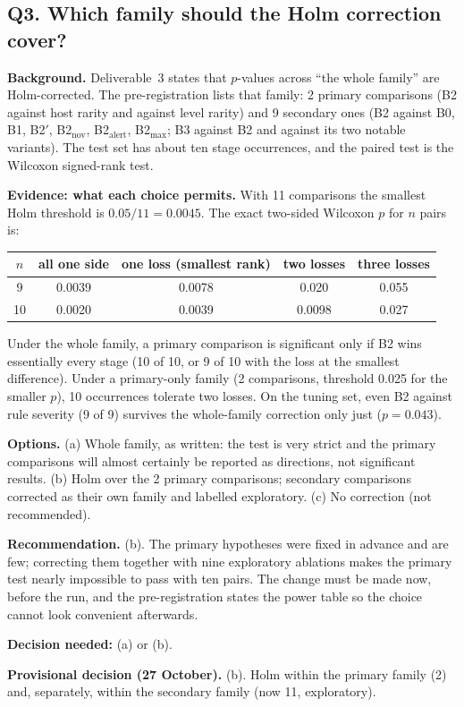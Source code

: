 \documentclass[10.5pt,a4paper]{article}
\newcommand{\rec}[1]{\par\smallskip\noindent\colorbox{gray!12}{\parbox{\dimexpr\linewidth-2\fboxsep}{\textbf{Recommendation.} #1}}\par\smallskip}
\newcommand{\ask}[1]{\par\noindent\textbf{Decision needed:} #1\par\medskip}
\newcommand{\dec}[1]{\par\smallskip\noindent\colorbox{blue!8}{\parbox{\dimexpr\linewidth-2\fboxsep}{\textbf{Provisional decision (27 October).} #1}}\par\medskip}
\newcommand{\sub}[1]{\par\smallskip\noindent\textbf{#1}\quad}
\begin{document}
\subsection*{Q3. Which family should the Holm correction cover?}

\sub{Background.} Deliverable~3 states that $p$-values across ``the whole family'' are Holm-corrected. The pre-registration lists that family: 2 primary comparisons (B2 against host rarity and against level rarity) and 9 secondary ones (B2 against B0, B1, B2$'$, B2$_\mathrm{nov}$, B2$_\mathrm{alert}$, B2$_\mathrm{max}$; B3 against B2 and against its two notable variants). The test set has about ten stage occurrences, and the paired test is the Wilcoxon signed-rank test.

\sub{Evidence: what each choice permits.} With 11 comparisons the smallest Holm threshold is $0.05/11 = 0.0045$. The exact two-sided Wilcoxon $p$ for $n$ pairs is:

\begin{center}\small
\begin{tabular}{@{}c c c c c@{}}
\toprule
$n$ & all one side & one loss (smallest rank) & two losses & three losses \\
\midrule
9 & 0.0039 & 0.0078 & 0.020 & 0.055 \\
10 & 0.0020 & 0.0039 & 0.0098 & 0.027 \\
\bottomrule
\end{tabular}
\end{center}

Under the whole family, a primary comparison is significant only if B2 wins essentially every stage (10 of 10, or 9 of 10 with the loss at the smallest difference). Under a primary-only family (2 comparisons, threshold 0.025 for the smaller $p$), 10 occurrences tolerate two losses. On the tuning set, even B2 against rule severity (9 of 9) survives the whole-family correction only just ($p = 0.043$).

\sub{Options.} (a) Whole family, as written: the test is very strict and the primary comparisons will almost certainly be reported as directions, not significant results. (b) Holm over the 2 primary comparisons; secondary comparisons corrected as their own family and labelled exploratory. (c) No correction (not recommended).

\rec{(b). The primary hypotheses were fixed in advance and are few; correcting them together with nine exploratory ablations makes the primary test nearly impossible to pass with ten pairs. The change must be made now, before the run, and the pre-registration states the power table so the choice cannot look convenient afterwards.}
\ask{(a) or (b).}
\dec{(b). Holm within the primary family (2) and, separately, within the secondary family (now 11, exploratory).}
\end{document}
